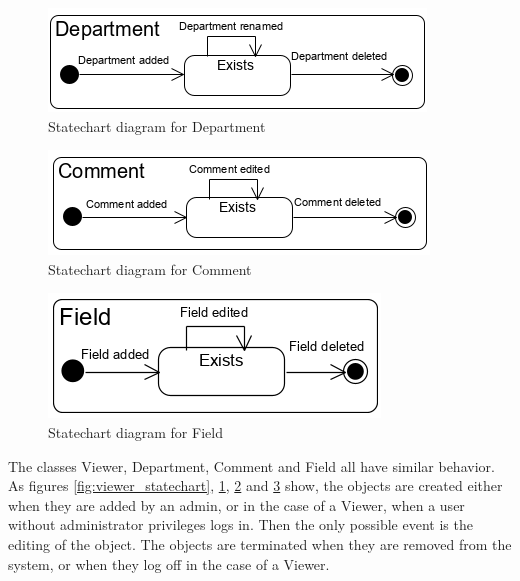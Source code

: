 \begin{figure}[H]
    \centering
    \includegraphics{figures/Department_statechart.png}
    \caption{Statechart diagram for Department}
    \label{fig:department_statechart}
\end{figure}

\begin{figure}[H]
    \centering
    \includegraphics{figures/Comment_statechart.png}
    \caption{Statechart diagram for Comment}
    \label{fig:comment_statechart}
\end{figure}

\begin{figure}[H]
    \centering
    \includegraphics{figures/Field_statechart.png}
    \caption{Statechart diagram for Field}
    \label{fig:field_statechart}
\end{figure}

The classes Viewer, Department, Comment and Field all have similar behavior. As figures \ref{fig:viewer_statechart}, \ref{fig:department_statechart}, \ref{fig:comment_statechart} and \ref{fig:field_statechart} show, the objects are created either when they are added by an admin, or in the case of a Viewer, when a user without administrator privileges logs in. Then the only possible event is the editing of the object. The objects are terminated when they are removed from the system, or when they log off in the case of a Viewer.